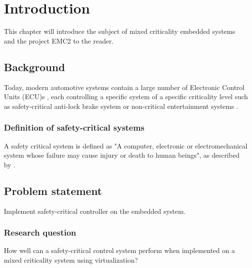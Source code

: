\chapter{Introduction}
\label{sec:introduction}
This chapter will introduce the subject of mixed criticality embedded systems and the project EMC2 to the reader.

\section{Background}
Today, modern automotive systems contain a large number of Electronic Control Units (ECU)s \cite{}, each controlling a specific system of a specific criticality level such as safety-critical anti-lock brake system or non-critical entertainment systems \cite{}. %

\subsection{Definition of safety-critical systems}
A safety critical system is defined as "A computer, electronic or electromechanical system whose failure may cause injury or death to human beings", as described by \cite{}.

\section{Problem statement}
Implement safety-critical controller on the embedded system.

\subsection{Research question}
How well can a safety-critical control system perform when implemented on a mixed criticality system using virtualization?

